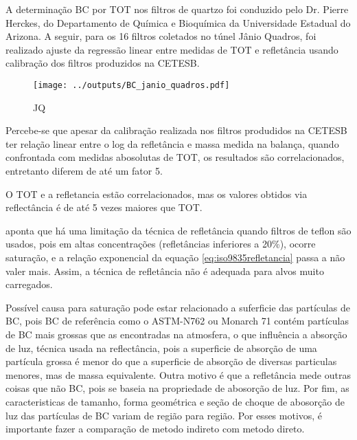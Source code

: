 A determinação BC por TOT nos filtros de quartzo foi conduzido pelo 
Dr. Pierre Herckes, do Departamento de Química e Bioquímica da 
Universidade Estadual do Arizona. A seguir, para os 16 filtros coletados no 
túnel Jânio Quadros, foi realizado ajuste da regressão linear
entre medidas de TOT e refletância usando calibração dos filtros produzidos na 
CETESB.

\begin{figure}
  \centering
  \begin{minipage}[b]{0.5\linewidth}
    \texttt{[image: ../outputs/BC\_janio\_quadros.pdf]}
    \caption{JQ}
  \end{minipage}%
  \hspace{0.5cm}
  \begin{minipage}[b]{0.45\linewidth}
    \begin{small}
      
    \end{small}
  \end{minipage}
\end{figure}

Percebe-se que apesar da calibração realizada nos filtros produdidos na CETESB
ter relação linear entre o log da refletância e massa medida na balança, quando
confrontada com medidas abosolutas de TOT, os resultados são correlacionados, 
entretanto diferem de até um fator 5. 

O TOT e a refletancia estão correlacionados, mas os valores obtidos via 
reflectância é de até 5 vezes maiores que TOT.

\citet{taha2007} aponta que há uma limitação da técnica de refletância quando 
filtros de teflon são usados, pois em altas concentrações (refletâncias
inferiores a 20\%), ocorre saturação, e a relação exponencial da equação 
\ref{eq:iso9835refletancia} passa a não valer mais. Assim, a técnica de
refletância não é adequada para alvos muito carregados.

Possível causa para saturação pode estar relacionado a suferficie das partículas 
de BC, pois BC de referência como o ASTM-N762 ou Monarch 71 contém partículas
de BC mais grossas que as encontradas na atmosfera, o que influência a 
absorção de luz, técnica usada na reflectância, pois a superficie de absorção
de uma partícula grossa é menor do que a superficie de absorção de diversas
particulas menores, mas de massa equivalente. Outra motivo é que a refletância
mede outras coisas que não BC, pois se baseia na propriedade de abosorção de luz.
Por fim, as caracteristicas de tamanho, forma geométrica e seção de choque
de abosorção de luz das partículas de BC variam de região para região.
Por esses motivos, é importante fazer a comparação de metodo indireto com 
metodo direto.

